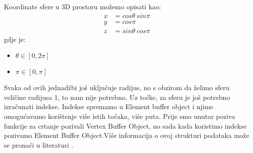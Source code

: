 Koordinate sfere u 3D prostoru možemo opisati kao:
\begin{equation}
	\begin{aligned}
		x &= cos\theta \ sin\pi \\
		y &= cos\pi \\
		z &= sin\theta \ cos\pi
	\end{aligned}
\end{equation}
gdje je:
\begin{itemize}
	\item $\theta \in [0,2\pi]$
	\item $\pi \in [0,\pi]$
\end{itemize}
Svaka od ovih jednadžbi još uključuje radijus, no s obzirom da želimo sferu veličine radijusa 1, to nam nije potrebno. Uz točke, za sferu je još potrebno izračunati indekse. Indekse spremamo u Element buffer object i njime omogućavamo korištenje više istih točaka, više puta\cite{15}. Prije smo unutar poziva funkcije za crtanje pozivali Vertex Buffer Object, no sada kada koristimo indekse pozivamo Element Buffer Object.Više informacija o ovoj strukturi podataka može se pronaći u literaturi \cite{15}\cite{16}.\newpage

